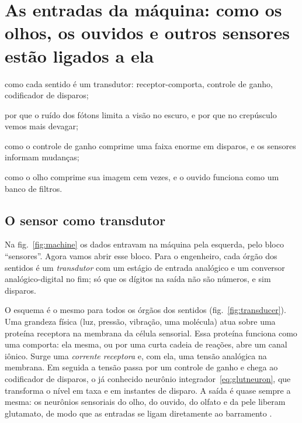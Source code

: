 \chapter{As entradas da máquina: como os olhos, os ouvidos e outros sensores estão ligados a ela}
\label{sec:sensors}
\begin{chaptergoals}
\item como cada sentido é um transdutor: receptor-comporta, controle de ganho, codificador de disparos;
\item por que o ruído dos fótons limita a visão no escuro, e por que no crepúsculo vemos mais devagar;
\item como o controle de ganho comprime uma faixa enorme em disparos, e os sensores informam mudanças;
\item como o olho comprime sua imagem cem vezes, e o ouvido funciona como um banco de filtros.
\end{chaptergoals}

\section{O sensor como transdutor}

Na fig.~\ref{fig:machine} os dados entravam na máquina pela esquerda, pelo bloco ``sensores''. Agora vamos abrir esse bloco. Para o engenheiro, cada órgão dos sentidos é um \emph{transdutor} com um estágio de entrada analógico e um conversor analógico-digital no fim; só que os dígitos na saída não são números, e sim disparos.

O esquema é o mesmo para todos os órgãos dos sentidos (fig.~\ref{fig:transducer}). Uma grandeza física (luz, pressão, vibração, uma molécula) atua sobre uma proteína receptora na membrana da célula sensorial. Essa proteína funciona como uma comporta: ela mesma, ou por uma curta cadeia de reações, abre um canal iônico. Surge uma \emph{corrente receptora} e, com ela, uma tensão analógica na membrana. Em seguida a tensão passa por um controle de ganho e chega ao codificador de disparos, o já conhecido neurônio integrador~\eqref{eq:glutneuron}, que transforma o nível em taxa e em instantes de disparo. A saída é quase sempre a mesma: os neurônios sensoriais do olho, do ouvido, do olfato e da pele liberam glutamato, de modo que as entradas se ligam diretamente ao barramento .


